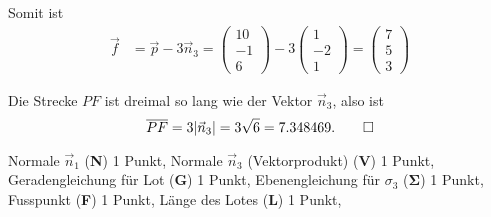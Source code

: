 \begin{loesung}
\begin{teilaufgaben}
Somit ist
\begin{align*}
\vec f
&=
\vec p -3\vec n_3
=
\begin{pmatrix}10\\-1\\6\end{pmatrix}
-3
\begin{pmatrix}1\\-2\\1\end{pmatrix}
=
\begin{pmatrix}7\\5\\3\end{pmatrix}
\end{align*}
\item
Die Strecke $PF$ ist dreimal so lang wie der Vektor $\vec n_3$, also ist
\[
\overline{PF}
=
3|\vec n_3|
=
3\sqrt{6}
=
7.348469.
\qedhere
\]
\end{teilaufgaben}
\end{loesung}

\begin{bewertung}
Normale $\vec n_1$ ({\bf N}) 1 Punkt,
Normale $\vec n_3$ (Vektorprodukt) ({\bf V}) 1 Punkt,
Geradengleichung für Lot ({\bf G}) 1 Punkt,
Ebenengleichung für $\sigma_3$ ($\mathbf{\Sigma}$) 1 Punkt,
Fusspunkt ({\bf F}) 1 Punkt,
Länge des Lotes ({\bf L}) 1 Punkt,
\end{bewertung}


